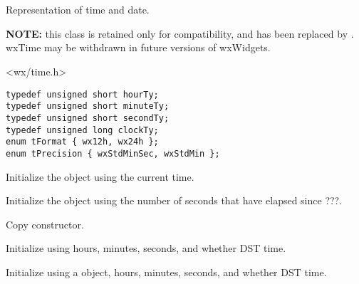 \section{}\label{wxtime}

Representation of time and date.

{\bf NOTE:} this class is retained only for compatibility,
and has been replaced by . wxTime
may be withdrawn in future versions of wxWidgets.




<wx/time.h>


\begin{verbatim}
typedef unsigned short hourTy;
typedef unsigned short minuteTy;
typedef unsigned short secondTy;
typedef unsigned long clockTy;
enum tFormat { wx12h, wx24h };
enum tPrecision { wxStdMinSec, wxStdMin };
\end{verbatim}




\label{wxtimewxtime}


Initialize the object using the current time.


Initialize the object using the number of seconds that have elapsed since ???.


Copy constructor.


Initialize using hours, minutes, seconds, and whether DST time.


Initialize using a  object, hours, minutes, seconds, and whether DST time.

